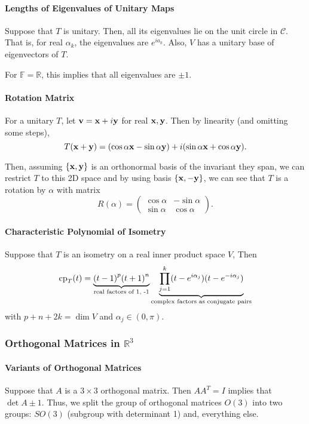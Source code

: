 \paragraph{Lengths of Eigenvalues of Unitary Maps}
Suppose that \( T \) is unitary. Then, all its eigenvalues lie on the
unit circle in \( \mathcal{C} \).
That is, for real \( \alpha_k \), the eigenvalues are \( e^{i a_k} \).
Also, \( V \) has a unitary base of eigenvectors of \( T \).

For \( \mathbb{F} = \mathbb{R} \), this implies that all eigenvalues
are \( \pm 1 \).

\paragraph{Rotation Matrix}
For a unitary \( T \), let \( \mathbf{v} = \mathbf{x} + i\mathbf{y} \) for real \( \mathbf{x}, \mathbf{y} \).
Then by linearity (and omitting some steps), \[
    T(\mathbf{x} + \mathbf{y}) = (\cos \alpha \mathbf{x} - \sin \alpha \mathbf{y}) + i(\sin \alpha \mathbf{x} + \cos \alpha \mathbf{y})
.\]

Then, assuming \( \left\{ \mathbf{x}, \mathbf{y} \right\} \) is an orthonormal basis of the invariant
they span, we can restrict \( T \) to this 2D space and by using basis
\( \left\{ \mathbf{x}, - \mathbf{y} \right\} \), we can see that \( T \) is a rotation by \( \alpha \)
with matrix \[
    R(\alpha) =
    \begin{pmatrix}
        \cos \alpha & - \sin \alpha \\
        \sin \alpha & \cos \alpha
    \end{pmatrix}
.\]

\paragraph{Characteristic Polynomial of Isometry}
Suppose that \( T \) is an isometry on a real inner product space
\( V \),
Then \[
    \mathrm{cp}_T(t)
    =
    \underbrace{{(t - 1)}^p {(t + 1)}^n}_{\text{real factors of 1, -1}}
    \underbrace{\prod_{j = 1}^{k} (t - e^{i \alpha_j}) (t - e^{-i\alpha_j})}_{\text{complex factors as conjugate pairs}}
\]
with \( p + n + 2k = \dim V \) and \( \alpha_j \in (0, \pi) \).

\subsubsection{Orthogonal Matrices in \(\mathbb{R}^3\)}

\paragraph{Variants of Orthogonal Matrices}
Suppose that \( A \) is a \( 3 \times 3 \) orthogonal matrix.
Then \( A A^T  = I \) implies that \( \det A \pm 1 \).
Thus, we split the group of orthogonal matrices \( O(3) \) into two groups:
\( SO(3) \) (subgroup with determinant 1) and, everything else.

